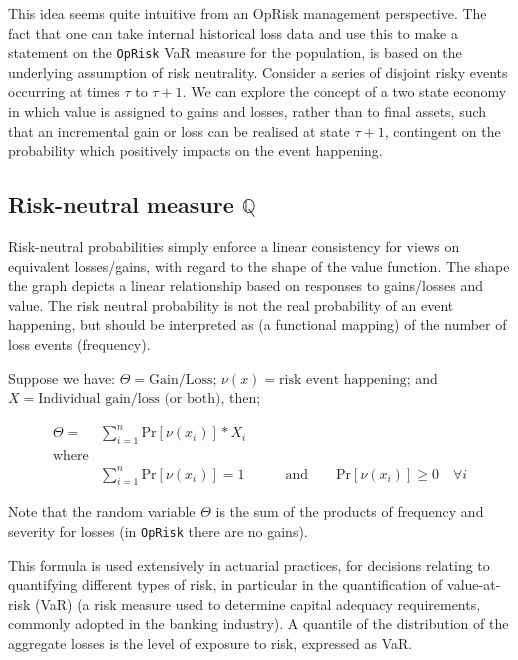 \documentclass[]{DissertateUSU}
\begin{document}
This idea seems quite intuitive from an OpRisk management perspective.
The fact that one can take internal historical loss data and use this to
make a statement on the \texttt{OpRisk} VaR measure for the population,
is based on the underlying assumption of risk neutrality. Consider a
series of disjoint risky events occurring at times \(\tau\) to
\(\tau + 1\). We can explore the concept of a two state economy in which
value is assigned to gains and losses, rather than to final assets, such
that an incremental gain or loss can be realised at state \(\tau + 1\),
contingent on the probability which positively impacts on the event
happening. \medskip

\subsection{Risk-neutral measure $\mathbb{Q}$}

Risk-neutral probabilities simply enforce a linear consistency for views
on equivalent losses/gains, with regard to the shape of the value
function. The shape the graph depicts a linear relationship based on
responses to gains/losses and value. The risk neutral probability is not
the real probability of an event happening, but should be interpreted as
(a functional mapping) of the number of loss events (frequency).\medskip

Suppose we have: \(\Theta = \mbox{Gain/Loss}\);
\(\nu(x) = \mbox{risk event happening}\); and
\(X = \mbox{Individual gain/loss (or both)}\), then; \singlespacing

\begin{eqnarray}\label{eqn3}
\Theta = &\sum_{i=1}^{n}\mbox{Pr}[\nu (x_{i})]*X_i & \\
 \mbox{where} \nonumber\\
&\sum_{i=1}^{n}\mbox{Pr}[\nu (x_{i})] = 1 &\qquad \mbox{and} \qquad \mbox{Pr}[\nu (x_{i})] \geq 0 \quad \forall i\nonumber
\end{eqnarray}

\doublespacing

Note that the random variable \(\Theta\) is the sum of the products of
frequency and severity for losses (in \texttt{OpRisk} there are no
gains).\medskip

This formula is used extensively in actuarial practices, for decisions
relating to quantifying different types of risk, in particular in the
quantification of value-at-risk (VaR) (a risk measure used to determine
capital adequacy requirements, commonly adopted in the banking
industry). A quantile of the distribution of the aggregate losses is the
level of exposure to risk, expressed as VaR.\medskip
\end{document}
